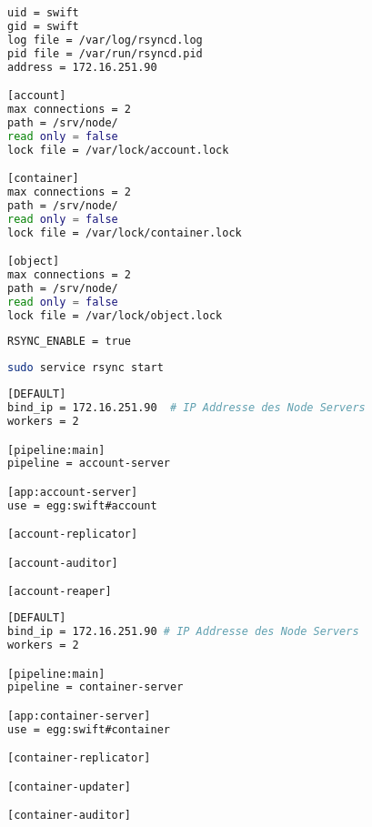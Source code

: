 \begin{lstlisting}[label=rsyncConf, language=Bash, caption=Rsyncd in /etc/rsyncd.conf konfigurieren]
uid = swift
gid = swift
log file = /var/log/rsyncd.log
pid file = /var/run/rsyncd.pid
address = 172.16.251.90 

[account]
max connections = 2
path = /srv/node/
read only = false
lock file = /var/lock/account.lock

[container]
max connections = 2
path = /srv/node/
read only = false
lock file = /var/lock/container.lock

[object]
max connections = 2
path = /srv/node/
read only = false
lock file = /var/lock/object.lock
\end{lstlisting}

\begin{lstlisting}[label=configRsyncDefault, language=Bash, caption=Rsync Aktivieren in /etc/default/rsync]
RSYNC_ENABLE = true
\end{lstlisting}

\begin{lstlisting}[label=startRsynx, language=Bash, caption=Rsync Starten]
sudo service rsync start
\end{lstlisting}

\begin{lstlisting}[label=account-server.conf, language=Bash, caption=Account Server in /etc/swift/account-server.conf konfigurieren]
[DEFAULT]
bind_ip = 172.16.251.90  # IP Addresse des Node Servers
workers = 2

[pipeline:main]
pipeline = account-server

[app:account-server]
use = egg:swift#account

[account-replicator]

[account-auditor]

[account-reaper]
\end{lstlisting}


\begin{lstlisting}[label=container-server.conf, language=Bash, caption=Container Server in /etc/swift/container-server.conf konfigurieren]
[DEFAULT]
bind_ip = 172.16.251.90 # IP Addresse des Node Servers
workers = 2

[pipeline:main]
pipeline = container-server

[app:container-server]
use = egg:swift#container

[container-replicator]

[container-updater]

[container-auditor]
\end{lstlisting}


